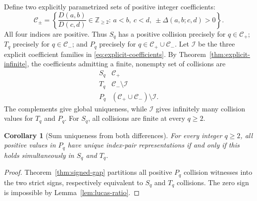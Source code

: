 \documentclass[11pt]{article}
\newtheorem{corollary}[theorem]{Corollary}
\begin{document}
Define two explicitly parametrized sets of
positive integer coefficients:
\begin{equation}\label{eq:sign-spectra}
\boxed{\quad
\mathcal C_{\pm}
=\left\{\frac{D(a,b)}{D(c,d)}\in\mathbb Z_{\ge2}:
\, a<b,\ c<d,\ \pm\Delta(a,b;c,d)>0\right\}.
\quad}
\end{equation}
All four indices are positive. Thus \(S_q\) has a
positive collision precisely for \(q\in\mathcal C_+\);
\(T_q\) precisely for \(q\in\mathcal C_-\);
and \(P_q\) precisely for
\(q\in\mathcal C_+\cup\mathcal C_-\).
Let \(\mathcal I\) be the three explicit coefficient
families in \eqref{eq:explicit-coefficients}.
By Theorem~\ref{thm:explicit-infinite}, the
coefficients admitting a finite, nonempty set of collisions are
\[
\begin{array}{c|l}
S_q & \mathcal C_+\\
T_q & \mathcal C_-\setminus\mathcal I\\
P_q &(\mathcal C_+\cup\mathcal C_-)
       \setminus\mathcal I.
\end{array}
\]
The complements give global uniqueness, while
\(\mathcal I\) gives infinitely many collision values
for \(T_q\) and \(P_q\). For \(S_q\), all collisions are
finite at every \(q\ge2\).

\begin{corollary}[Sum uniqueness from both differences]
\label{cor:sum-both}
For every integer \(q\ge2\), all positive values
in \(P_q\) have unique index-pair representations
if and only if this holds simultaneously in
\(S_q\) and \(T_q\).
\end{corollary}
\begin{proof}
Theorem~\ref{thm:signed-gap} partitions all positive
\(P_q\) collision witnesses into the two strict
signs, respectively equivalent to \(S_q\) and \(T_q\)
collisions. The zero sign is impossible by
Lemma~\ref{lem:lucas-ratio}.
\end{proof}
\end{document}
